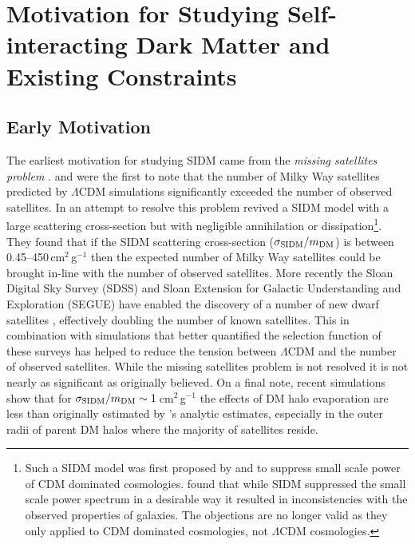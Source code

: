 \section{Motivation for Studying Self-interacting Dark Matter and Existing Constraints}\label{section:SIDMmotivation}

\subsection{Early Motivation}

The earliest motivation for studying SIDM came from the \textit{missing satellites problem} \citep[see][for a thorough review]{Bullock:2010uv}.
\citet{Moore:1999ja} and \citet{Klypin:1999ej} were the first to note that the number of Milky Way satellites predicted by $\Lambda$CDM simulations significantly exceeded the number of observed satellites.
In an attempt to resolve this problem \citet{Spergel:2000cb} revived a SIDM model with a large scattering cross-section but with negligible annihilation or dissipation\footnote{Such a SIDM model was first proposed by \citet{Carlson:1992cp} and \citet{Machacek:1994kj} to suppress small scale power of CDM dominated cosmologies.  \citet{deLaix:1995ey} found that while SIDM suppressed the small scale power spectrum in a desirable way it resulted in inconsistencies with the observed properties of galaxies.  The \citet{deLaix:1995ey} objections are no longer valid as they only applied to CDM dominated cosmologies, not $\Lambda$CDM cosmologies.}. 
They found that if the SIDM scattering cross-section ($\sigma_{\rm SIDM}/m_{\rm DM}$) is between 0.45--450\,cm$^2$\,g$^{-1}$ then the expected number of Milky Way satellites could be brought in-line with the number of observed satellites.
More recently the Sloan Digital Sky Survey (SDSS) and Sloan Extension for Galactic Understanding and Exploration (SEGUE) have enabled the discovery of a number of new dwarf satellites \citep[see][for a review]{Willman:2010fg}, effectively doubling the number of known satellites.
This in combination with simulations that better quantified the selection function of these surveys has helped to reduce the tension between $\Lambda$CDM and the number of observed satellites.
While the missing satellites problem is not resolved it is not nearly as significant as originally believed.
On a final note, recent simulations \citep{Rocha:2012tr} show that for $\sigma_{\rm SIDM}/m_{\rm DM} \sim 1$\,cm$^2$\,g$^{-1}$ the effects of DM halo evaporation are less than originally estimated by \citet{Spergel:2000cb}'s analytic estimates, especially in the outer radii of parent DM halos where the majority of satellites reside.

